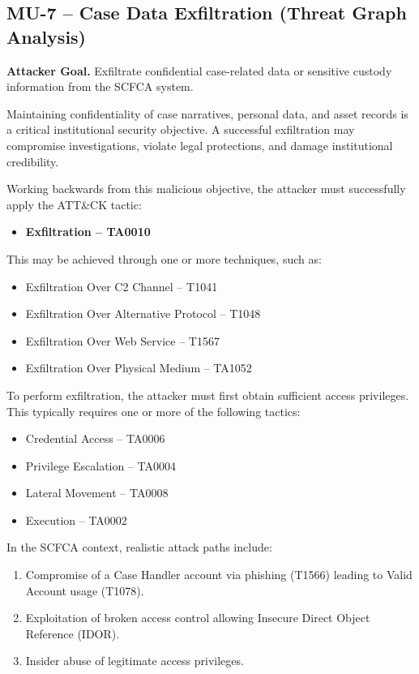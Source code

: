 \documentclass[12pt,a4paper]{report}
\begin{document}
\subsection{MU-7 – Case Data Exfiltration (Threat Graph Analysis)}

\textbf{Attacker Goal.}  
Exfiltrate confidential case-related data or sensitive custody information from the SCFCA system.

Maintaining confidentiality of case narratives, personal data, and asset records is a critical institutional security objective. A successful exfiltration may compromise investigations, violate legal protections, and damage institutional credibility.

Working backwards from this malicious objective, the attacker must successfully apply the ATT\&CK tactic:

\begin{itemize}
    \item \textbf{Exfiltration – TA0010}
\end{itemize}

This may be achieved through one or more techniques, such as:

\begin{itemize}
    \item Exfiltration Over C2 Channel – T1041
    \item Exfiltration Over Alternative Protocol – T1048
    \item Exfiltration Over Web Service – T1567
     \item Exfiltration Over Physical Medium – TA1052
\end{itemize}

To perform exfiltration, the attacker must first obtain sufficient access privileges. This typically requires one or more of the following tactics:

\begin{itemize}
    \item Credential Access – TA0006
    \item Privilege Escalation – TA0004
    \item Lateral Movement – TA0008
    \item Execution – TA0002
\end{itemize}

In the SCFCA context, realistic attack paths include:

\begin{enumerate}
    \item Compromise of a Case Handler account via phishing (T1566) leading to Valid Account usage (T1078).
    \item Exploitation of broken access control allowing Insecure Direct Object Reference (IDOR).
    \item Insider abuse of legitimate access privileges.
\end{enumerate}
\end{document}
